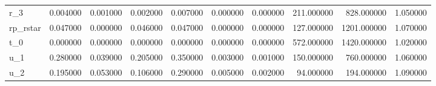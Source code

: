 \begin{tabular}{lrrrrrrrrr}
r_3 & 0.004000 & 0.001000 & 0.002000 & 0.007000 & 0.000000 & 0.000000 & 211.000000 & 828.000000 & 1.050000 \\
rp_rstar & 0.047000 & 0.000000 & 0.046000 & 0.047000 & 0.000000 & 0.000000 & 127.000000 & 1201.000000 & 1.070000 \\
t_0 & 0.000000 & 0.000000 & 0.000000 & 0.000000 & 0.000000 & 0.000000 & 572.000000 & 1420.000000 & 1.020000 \\
u_1 & 0.280000 & 0.039000 & 0.205000 & 0.350000 & 0.003000 & 0.001000 & 150.000000 & 760.000000 & 1.060000 \\
u_2 & 0.195000 & 0.053000 & 0.106000 & 0.290000 & 0.005000 & 0.002000 & 94.000000 & 194.000000 & 1.090000 \\
\bottomrule
\end{tabular}
